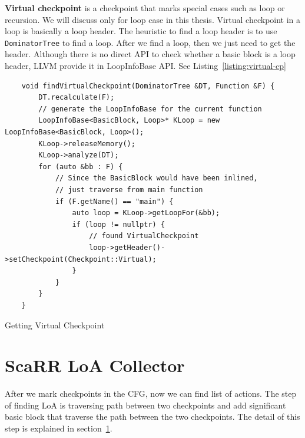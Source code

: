 \vspace{0.5cm}
\noindent \textbf{Virtual checkpoint} is a checkpoint that marks special cases
such as loop or recursion. We will discuss only for loop case in this thesis.
Virtual checkpoint in a loop is basically a loop header. The heuristic to find a
loop header is to use \texttt{DominatorTree} to find a loop. After we find a
loop, then we just need to get the header. Although there is no direct API to
check whether a basic block is a loop header, LLVM provide it in LoopInfoBase
API. See Listing~\ref{listing:virtual-cp}

\begin{listing}[htbp]
    \begin{verbatim}
    void findVirtualCheckpoint(DominatorTree &DT, Function &F) {
        DT.recalculate(F);
        // generate the LoopInfoBase for the current function
        LoopInfoBase<BasicBlock, Loop>* KLoop = new LoopInfoBase<BasicBlock, Loop>();
        KLoop->releaseMemory();
        KLoop->analyze(DT);
        for (auto &bb : F) {
            // Since the BasicBlock would have been inlined, 
            // just traverse from main function
            if (F.getName() == "main") {
                auto loop = KLoop->getLoopFor(&bb);
                if (loop != nullptr) {
                    // found VirtualCheckpoint
                    loop->getHeader()->setCheckpoint(Checkpoint::Virtual);
                }
            }
        }
    }
    \end{verbatim}
    \caption{Getting Virtual Checkpoint}
    \label{listing:virtual-cp}
\end{listing}




\section{ScaRR LoA Collector}
\label{sec:scarr-loa-collector}

After we mark
checkpoints in the CFG, now we can find list of actions. The step of finding LoA
is traversing path between two checkpoints and add significant basic block that
traverse the path between the two checkpoints. The detail of this step is
explained in section~\ref{sec:scarr-loa-collector}.



